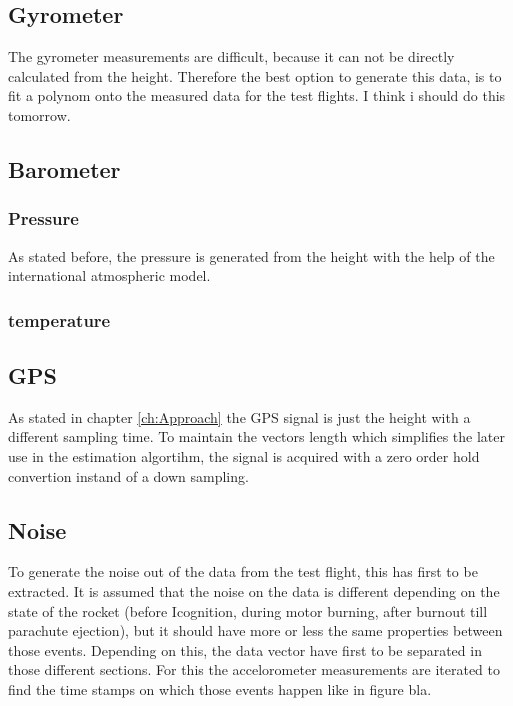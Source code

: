 \subsection{Gyrometer}
The gyrometer measurements are difficult, because it can not be directly calculated from the height.
Therefore the best option to generate this data, is to fit a polynom onto the measured data for the test flights.
I think i should do this tomorrow.

\subsection{Barometer}
\subsubsection{Pressure}
As stated before, the pressure is generated from the height with the help of the international atmospheric model.
\subsubsection{temperature}

\subsection{GPS}
As stated in chapter \ref{ch:Approach} the GPS signal is just the height with a different sampling time. 
To maintain the vectors length which simplifies the later use in the estimation algortihm,
the signal is acquired with a zero order hold convertion instand of a down sampling. 


\subsection{Noise}
To generate the noise out of the data from the test flight, this has first to be extracted.
It is assumed that the noise on the data is different depending on the state of the rocket (before Icognition, during motor burning, after burnout till parachute ejection),
but it should have more or less the same properties between those events.
Depending on this, the data vector have first to be separated in those different sections.
For this the accelorometer measurements are iterated to find the time stamps on which those events happen like in figure bla.


